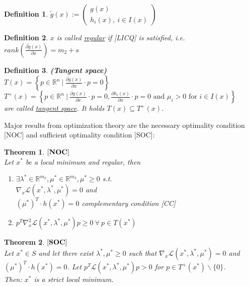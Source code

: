 \documentclass{scrartcl}[12pt, halfparskip]
\newtheorem{Definition}{Definition}
\newtheorem{Theorem}{Theorem}
\begin{document}
\begin{Definition}
	$\tilde{g}(x) := 
	\begin{pmatrix}
		g(x) \\
		h_i(x), \ i \in I(x) 
	\end{pmatrix}$
\end{Definition}

\begin{Definition}
	$x$ is called \underline{regular} if [LICQ] is satisfied, i.e. $rank \left( \frac{\partial \tilde g(x)}{\partial x} \right) = m_2 + s$
\end{Definition}

\begin{Definition}
	\textbf{(Tangent space)} \\
	$T(x) = \left\{ p \in \mathbb{R}^n \ | \ \frac{\partial \tilde g(x)}{\partial x} \cdot p = 0 \right\}$ \\
	$T^+(x) = \left\{ p \in \mathbb{R}^n \ | \ \frac{\partial g(x)}{\partial x} \cdot p = 0, \frac{\partial h_i(x)}{\partial x} \cdot p = 0 \text{ and } \mu_i > 0 \text{ for } i \in I(x) \right\}$ \\
	are called \underline{tangent space}. It holds $T(x) \subseteq T^+(x)$.
\end{Definition}



Major results from optimization theory are the necessary optimality condition [NOC] and sufficient optimality condition [SOC]: 

\begin{Theorem}
	$[\text{\textbf{NOC}}]$ \\
	Let $x^*$ be a local minimum and regular, then
	\begin{enumerate}
		\item $\exists \lambda^* \in \mathbb{R}^{m_2}, \mu^* \in \mathbb{R}^{m_3}, \mu^* \ge 0$ s.t. \\
		$\nabla_x \mathcal{L}(x^*, \lambda^*, \mu^*) = 0$ and \\
		$(\mu^*)^T \cdot h(x^*) = 0$ complementary condition [CC]
		\item $p^T \nabla_x^2 \mathcal{L}(x^*, \lambda^*, \mu^*) p \ge 0 \ \forall \ p \in T(x^*)$
	\end{enumerate}
\end{Theorem}


\begin{Theorem}
	$[\text{\textbf{SOC}}]$ \\
	Let $x^* \in S$ and let there exist $\lambda^*, \mu^* \ge 0$ such that $\nabla_x \mathcal{L}(x^*, \lambda^*, \mu^*) = 0$ and \\ $(\mu^*)^T \cdot h(x^*) = 0$. 
	Let $p^T \mathcal{L}(x^*, \lambda^*, \mu^*) p > 0$ for $p \in T^+(x^*) \backslash \{0\}$. \\
	Then: $x^*$ is a strict local minimum.
\end{Theorem}
\end{document}
